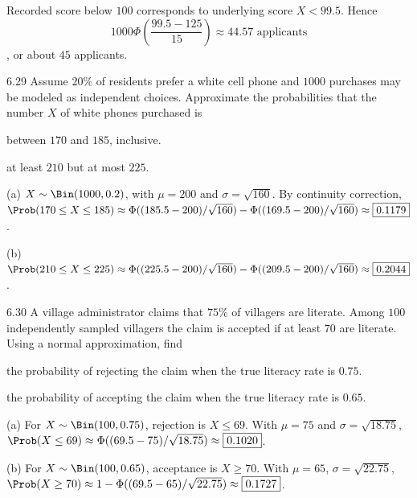 \documentclass[11pt,oneside]{article}
\begin{document}
\begin{solution}
Recorded score below $100$ corresponds to underlying score $X<99.5$. Hence \[1000\Phi\!\left(\frac{99.5-125}{15}\right)\approx\boxed{44.57\text{ applicants}}\], or about $45$ applicants.
\end{solution}

\begin{exercise}{6.29}
Assume $20\%$ of residents prefer a white cell phone and $1000$ purchases may be modeled as independent choices. Approximate the probabilities that the number $X$ of white phones purchased is
\begin{exercisesubparts}
\item between $170$ and $185$, inclusive.
\item at least $210$ but at most $225$.
\end{exercisesubparts}
\end{exercise}

\begin{solution}
\noindent\textup{(a)} $X\sim\Bin(1000,0.2)$, with $\mu=200$ and $\sigma=\sqrt{160}$. By continuity correction, $\Prob(170\le X\le185)\approx\Phi((185.5-200)/\sqrt{160})-\Phi((169.5-200)/\sqrt{160})\approx\boxed{0.1179}$.

\noindent\textup{(b)} $\Prob(210\le X\le225)\approx\Phi((225.5-200)/\sqrt{160})-\Phi((209.5-200)/\sqrt{160})\approx\boxed{0.2044}$.
\end{solution}

\begin{exercise}{6.30}
A village administrator claims that $75\%$ of villagers are literate. Among $100$ independently sampled villagers the claim is accepted if at least $70$ are literate. Using a normal approximation, find
\begin{exercisesubparts}
\item the probability of rejecting the claim when the true literacy rate is $0.75$.
\item the probability of accepting the claim when the true literacy rate is $0.65$.
\end{exercisesubparts}
\end{exercise}

\begin{solution}
\noindent\textup{(a)} For $X\sim\Bin(100,0.75)$, rejection is $X\le69$. With $\mu=75$ and $\sigma=\sqrt{18.75}$, $\Prob(X\le69)\approx\Phi((69.5-75)/\sqrt{18.75})\approx\boxed{0.1020}$.

\noindent\textup{(b)} For $X\sim\Bin(100,0.65)$, acceptance is $X\ge70$. With $\mu=65$, $\sigma=\sqrt{22.75}$, $\Prob(X\ge70)\approx1-\Phi((69.5-65)/\sqrt{22.75})\approx\boxed{0.1727}$.
\end{solution}
\end{document}
